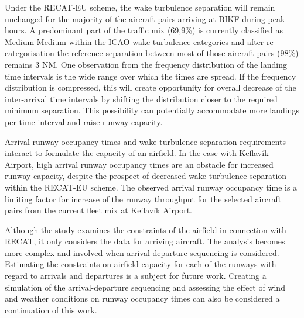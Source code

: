 Under the RECAT-EU scheme, the wake turbulence separation will remain unchanged for the majority of the aircraft pairs arriving at BIKF during peak hours. A predominant part of the traffic mix (69,9\%) is currently classified as Medium-Medium within the ICAO wake turbulence categories and after re-categorisation the reference separation between most of those aircraft pairs (98\%) remains 3 NM. One observation from the frequency distribution of the landing time intervals is the wide range over which the times are spread. If the frequency distribution is compressed, this will create opportunity for overall decrease of the inter-arrival time intervals by shifting the distribution closer to the required minimum separation. This possibility can potentially accommodate more landings per time interval and raise runway capacity.

Arrival runway occupancy times and wake turbulence separation requirements interact to formulate the capacity of an airfield. In the case with Keflavík Airport, high arrival runway occupancy times are an obstacle for increased runway capacity, despite the prospect of decreased wake turbulence separation within the RECAT-EU scheme. The observed arrival runway occupancy time is a limiting factor for increase of the runway throughput for the selected aircraft pairs from the current fleet mix at Keflavík Airport.

Although the study examines the constraints of the airfield in connection with RECAT, it only considers the data for arriving aircraft. The analysis becomes more complex and involved when arrival-departure sequencing is considered. Estimating the constraints on airfield capacity for each of the runways with regard to arrivals and departures is a subject for future work. Creating a simulation of the arrival-departure sequencing and assessing the effect of wind and weather conditions on runway occupancy times can also be considered a continuation of this work.




